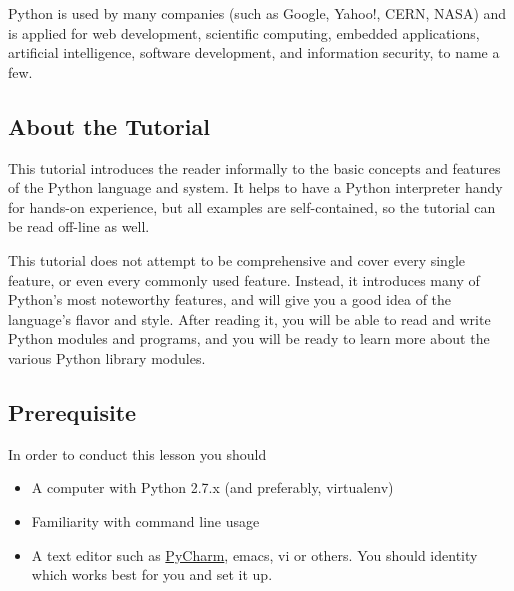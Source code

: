 Python is used by many companies (such as Google, Yahoo!, CERN, NASA)
and is applied for web development, scientific computing, embedded
applications, artificial intelligence, software development, and
information security, to name a few.


\subsection{About the Tutorial}
\label{\detokenize{lesson/prg/python_intro:about-the-tutorial}}
This tutorial introduces the reader informally to the basic concepts
and features of the Python language and system. It helps to have a
Python interpreter handy for hands-on experience, but all examples are
self-contained, so the tutorial can be read off-line as well.

This tutorial does not attempt to be comprehensive and cover every
single feature, or even every commonly used feature. Instead, it
introduces many of Python's most noteworthy features, and will give
you a good idea of the language's flavor and style. After reading it,
you will be able to read and write Python modules and programs, and
you will be ready to learn more about the various Python library
modules.


\subsection{Prerequisite}
\label{\detokenize{lesson/prg/python_intro:the-zen-of-python}}\label{\detokenize{lesson/prg/python_intro:prerequisite}}
In order to conduct this lesson you should
\begin{itemize}
\item {} 
A computer with Python 2.7.x (and preferably, virtualenv)

\item {} 
Familiarity with command line usage

\item {} 
A text editor such as \href{https://www.jetbrains.com/pycharm/}{PyCharm}, emacs, vi or others. You
should identity which works best for you and set it up.

\end{itemize}


